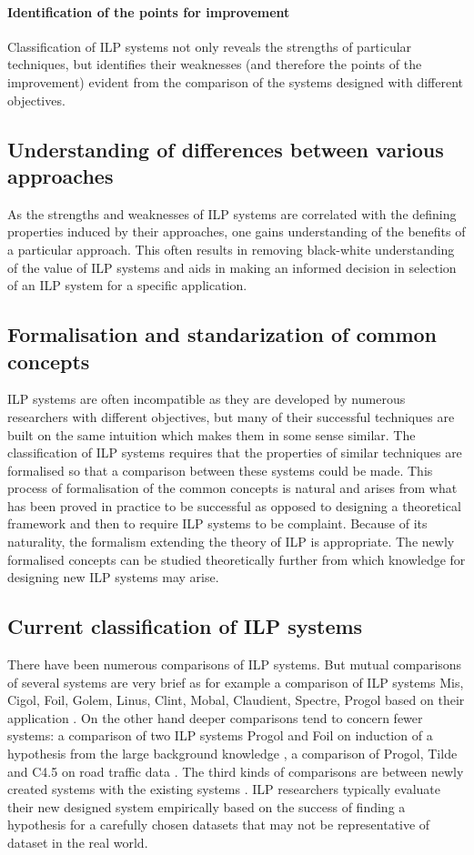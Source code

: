 \paragraph{Identification of the points for improvement}
Classification of ILP systems not only reveals the strengths of particular techniques, but identifies their weaknesses (and therefore the points of the improvement) evident from the comparison of the systems designed with different objectives.
\subsection{Understanding of differences between various approaches}
As the strengths and weaknesses of ILP systems are correlated with the defining properties induced by their approaches, one gains understanding of the benefits of a particular approach. This often results in removing black-white understanding of the value of ILP systems and aids in making an informed decision in selection of an ILP system for a specific application.

\subsection{Formalisation and standarization of common concepts}
ILP systems are often incompatible as they are developed by numerous researchers with different objectives, but many of their successful techniques are built on the same intuition which makes them in some sense similar. The classification of ILP systems requires that the properties of similar techniques are formalised so that a comparison between these systems could be made. This process of formalisation of the common concepts is natural and arises from what has been proved in practice to be successful as opposed to designing a theoretical framework and then to require ILP systems to be complaint. Because of its naturality, the formalism extending the theory of ILP is appropriate. The newly formalised concepts can be studied theoretically further from which knowledge for designing new ILP systems may arise.

\subsection{Current classification of ILP systems}
There have been numerous comparisons of ILP systems. But mutual comparisons of several systems are very brief as for example a comparison of ILP systems Mis, Cigol, Foil, Golem, Linus, Clint, Mobal, Claudient, Spectre, Progol based on their application \cite{nienhuys1997foundations}.
On the other hand deeper comparisons tend to concern fewer systems: 
a comparison of two ILP systems Progol and Foil on induction of a hypothesis from the large background knowledge \cite{srinivasan1995comparing},
a comparison of Progol, Tilde and C4.5 on road traffic data \cite{roberts1998comparison}. The third kinds of comparisons are between newly created systems with the existing systems \cite{muggleton2012mc} \cite{corapi2011nonmonotonic}.
ILP researchers typically evaluate their new designed system empirically based on the success of finding a hypothesis for a carefully chosen datasets that may not be representative of dataset in the real world.

